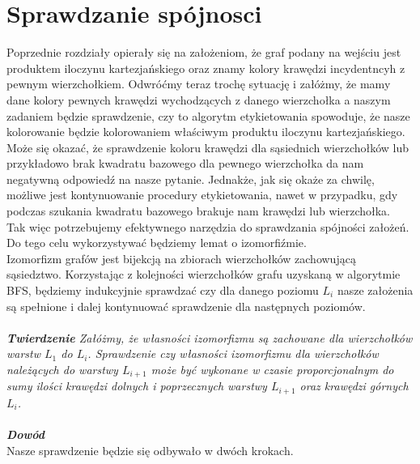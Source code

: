 \documentclass[12pt,a4paper,titlepage]{article}
\begin{document}
\section{Sprawdzanie spójnosci}
Poprzednie rozdziały opierały się na założeniom, że graf podany na wejściu jest produktem iloczynu kartezjańskiego oraz znamy kolory krawędzi incydentncyh z pewnym wierzchołkiem. Odwróćmy teraz trochę sytuację i załóżmy, że mamy dane kolory pewnych krawędzi wychodzących z danego wierzchołka a naszym zadaniem będzie sprawdzenie, czy to algorytm etykietowania spowoduje, że nasze kolorowanie będzie kolorowaniem właściwym produktu iloczynu kartezjańskiego. Może się okazać, że sprawdzenie koloru krawędzi dla sąsiednich wierzchołków lub przykładowo brak kwadratu bazowego dla pewnego wierzchołka da nam negatywną odpowiedź na nasze pytanie. Jednakże, jak się okaże za chwilę, możliwe jest kontynuowanie procedury etykietowania, nawet w przypadku, gdy podczas szukania kwadratu bazowego brakuje nam krawędzi lub wierzchołka.\\
Tak więc potrzebujemy efektywnego narzędzia do sprawdzania spójności założeń. Do tego celu wykorzystywać będziemy lemat o izomorfiźmie.\\
Izomorfizm grafów jest bijekcją na zbiorach wierzchołków zachowującą sąsiedztwo. Korzystając z kolejności wierzchołków grafu uzyskaną w algorytmie BFS, będziemy indukcyjnie sprawdzać czy dla danego poziomu $L_i$ nasze założenia są spełnione i dalej kontynuować sprawdzenie dla następnych poziomów. \\
\\
\textit{\textbf{Twierdzenie} Załóżmy, że własności izomorfizmu są zachowane dla wierzchołków warstw $L_1$ do $L_i$. Sprawdzenie czy własności izomorfizmu dla wierzchołków należących do warstwy $L_{i+1}$ może być wykonane w czasie proporcjonalnym do sumy ilości krawędzi dolnych i poprzecznych warstwy $L_{i+1}$ oraz krawędzi górnych $L_{i}$.} \\
\\
\textit{\textbf{Dowód}}\\
Nasze sprawdzenie będzie się odbywało w dwóch krokach.\\
\end{document}
